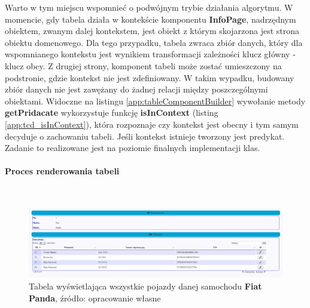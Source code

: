 	Warto w tym miejscu wspomnieć o podwójnym trybie działania algorytmu. W momencie, gdy tabela działa w kontekście komponentu \textbf{InfoPage}, nadrzędnym obiektem, zwanym dalej kontekstem, jest obiekt z którym skojarzona jest strona obiektu domenowego. Dla tego przypadku, tabela zwraca zbiór danych, który dla wspomnianego kontekstu jest wynikiem transformacji zależności klucz główny - klucz obcy. Z drugiej strony, komponent tabeli może zostać umieszczony na podstronie, gdzie kontekst nie jest zdefiniowany. W takim wypadku, budowany zbiór danych nie jest zawężany do żadnej relacji między poszczególnymi obiektami. Widoczne na listingu \ref{app:tableComponentBuilder} wywołanie metody \textbf{getPridacate} wykorzystuje funkcję \textbf{isInContext} (listing \ref{app:tcd_isInContext}), która rozpoznaje czy kontekst jest obecny i tym samym decyduje o zachowaniu tabeli. Jeśli kontekst istnieje tworzony jest predykat. Zadanie to realizowane jest na poziomie finalnych implementacji klas.
		
	
	\paragraph{Proces renderowania tabeli} \hspace{0pt} \\
	\begin{figure}[hb]
		\centering
		\includegraphics[width=1.0\textwidth]{images/table_inContext}
		\caption[Tabela wyświetlająca wszystkie pojazdy danej marki i modelu]{
			Tabela wyświetlająca wszystkie pojazdy danej samochodu \textbf{Fiat Panda}, źródło: opracowanie własne
		}
		\label{app:tableInContext}
	\end{figure}	
	
